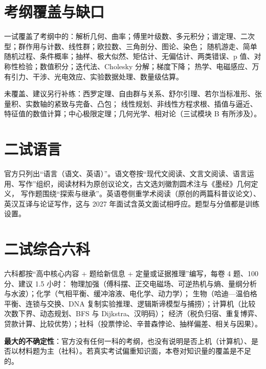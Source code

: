 \documentclass[cjk=noto, nomargin]{mojing-notes}
\begin{document}
\section{考纲覆盖与缺口}

一试覆盖了考纲中的：解析几何、曲率；傅里叶级数、多元积分；谱定理、二次型；群作用与计数、线性群；欧拉数、三角剖分、图论、染色；
随机游走、简单随机过程、条件概率；抽样、极大似然、矩估计、无偏估计、两类错误、p 值、对称性检验；数值积分；迭代法、Cholesky 分解；梯度下降；
热学、电磁感应、万有引力、干涉、光电效应、实验数据处理、数量级估算。

未覆盖、建议另行补练：西罗定理、自由群与关系、舒尔引理、若尔当标准形、张量积、实数轴的紧致与完备、凸包；
线性规划、非线性方程求根、插值与逼近、特征值的数值计算；中心极限定理；几何光学、相对论（三试模块 B 有所涉及）。


\section{二试语言}

官方只列出“语言（语文、英语）”。语文卷按“现代文阅读、文言文阅读、语言运用、写作”组织，阅读材料为原创议论文，古文选刘徽割圆术注与《墨经》几何定义，
写作题围绕“探索与继承”。英语卷侧重学术阅读（原创的两篇科普议论文）、英汉互译与论证写作，这与 2027 年面试含英文面试相呼应。题型与分值都是训练设置。

\section{二试综合六科}

六科都按“高中核心内容 + 题给新信息 + 定量或证据推理”编写，每卷 4 题、100 分、建议 1.5 小时：
物理加强（傅科摆、正交电磁场、可逆热机与熵、量纲分析与水波）；化学（气相平衡、缓冲溶液、电化学、动力学）；
生物（哈迪—温伯格平衡、连锁与交换、DNA 复制实验推理、逻辑斯谛模型与捕捞）；计算机（比较次数下界、动态规划、BFS 与 Dijkstra、汉明码）；
经济（税负归宿、重复博弈、贷款计算、比较优势）；社科（投票悖论、辛普森悖论、抽样偏差、相关与因果）。

\textbf{最大的不确定性}：官方没有任何一科的考纲，也没有说明是否上机（计算机）、是否以材料题为主（社科）。若真实考试偏重知识面，本卷对知识量的覆盖是不足的。
\end{document}
